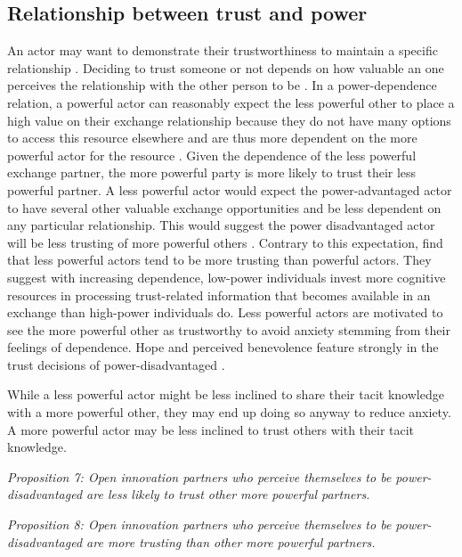 \subsection{Relationship between trust and power}

An actor may want to demonstrate their trustworthiness to maintain a specific relationship \citep{schilke2015power}. Deciding to trust someone or not depends on how valuable an one perceives the relationship with the other person to be \citep{axelrod1984evolution}. In a power-dependence relation, a powerful actor can reasonably expect the less powerful other to place a high value on their exchange relationship because they do not have many options to access this resource elsewhere and are thus more dependent on the more powerful actor for the resource \citep{emerson1962power}. Given the dependence of the less powerful exchange partner, the more powerful party is more likely to trust their less powerful partner. A less powerful actor would expect the power-advantaged actor to have several other valuable exchange opportunities and be less dependent on any particular relationship. This would suggest the power disadvantaged actor will be less trusting of more powerful others \citep{schilke2015power}. Contrary to this expectation, \citet{schilke2015power} find that less powerful actors tend to be more trusting than powerful actors. They suggest with increasing dependence, low-power individuals invest more cognitive resources in processing trust-related information that becomes available in an exchange than high-power individuals do. Less powerful actors are motivated to see the more powerful other as trustworthy to avoid anxiety stemming from their feelings of dependence. Hope and perceived benevolence feature strongly in the trust decisions of power-disadvantaged \citep{schilke2015power}. \medskip

While a less powerful actor might be less inclined to share their tacit knowledge with a more powerful other, they may end up doing so anyway to reduce anxiety. A more powerful actor may be less inclined to trust others with their tacit knowledge. \medskip

\emph{Proposition 7: Open innovation partners who perceive themselves to be power-disadvantaged are less likely to trust other more powerful partners.}

\emph{Proposition 8: Open innovation partners who perceive themselves to be power-disadvantaged are more trusting than other more powerful partners.}


